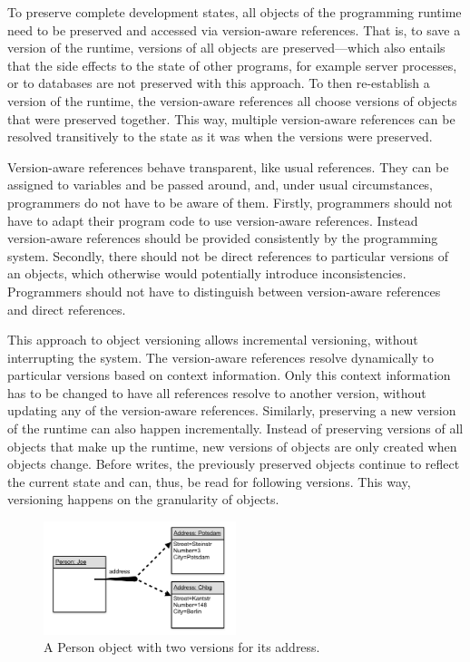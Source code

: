 To preserve complete development states, all objects of the programming runtime need to be preserved and accessed via version-aware references.
That is, to save a version of the runtime, versions of all objects are preserved---which also entails that the side effects to the state of other programs, for example server processes, or to databases are not preserved with this approach.
To then re-establish a version of the runtime, the version-aware references all choose versions of objects that were preserved together.
This way, multiple version-aware references can be resolved transitively to the state as it was when the versions were preserved.

Version-aware references behave transparent, like usual references.
They can be assigned to variables and be passed around, and, under usual circumstances, programmers do not have to be aware of them.
Firstly, programmers should not have to adapt their program code to use version-aware references.
Instead version-aware references should be provided consistently by the programming system.
Secondly, there should not be direct references to particular versions of an objects, which otherwise would potentially introduce inconsistencies.
Programmers should not have to distinguish between version-aware references and direct references.

This approach to object versioning allows incremental versioning, without interrupting the system.
The version-aware references resolve dynamically to particular versions based on context information.
Only this context information has to be changed to have all references resolve to another version, without updating any of the version-aware references.
Similarly, preserving a new version of the runtime can also happen incrementally.
Instead of preserving versions of all objects that make up the runtime, new versions of objects are only created when objects change.
Before writes, the previously preserved objects continue to reflect the current state and can, thus, be read for following versions.
This way, versioning happens on the granularity of objects.

\begin{figure}[h]
    \centering
    \includegraphics[width=0.5\textwidth]{figures/versionAwareReference.png}
    \caption{A Person object with two versions for its address.}
    \label{fig:VersionAwareReference}
\end{figure}

